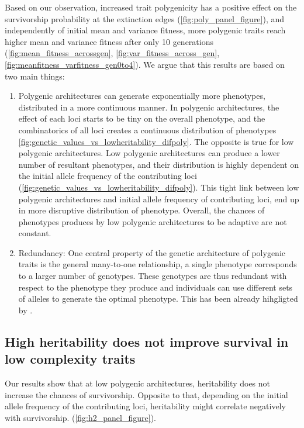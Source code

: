 \documentclass{article}
\begin{document}
Based on our observation, increased trait polygenicity has a positive effect on the survivorship probability at the extinction edges (\ref{fig:poly_panel_figure}), and independently of initial mean and variance fitness, more polygenic traits reach higher mean  and variance fitness after only 10 generations (\ref{fig:mean_fitness_acrossgen},  \ref{fig:var_fitness_across_gen}, \ref{fig:meanfitness_varfitness_gen0to4}). We argue that this results are based on two main things: 
\begin{enumerate}
    \item Polygenic architectures can generate exponentially more phenotypes, distributed in a more continuous manner. In polygenic architectures, the effect of each loci starts to be tiny on the overall phenotype, and the combinatorics of all loci creates a continuous distribution of phenotypes \ref{fig:genetic_values_vs_lowheritability_difpoly}. The opposite is true for low polygenic architectures. Low polygenic architectures can produce a lower number of resultant phenotypes, and their distribution is highly dependent on the initial allele frequency of the contributing loci (\ref{fig:genetic_values_vs_lowheritability_difpoly}). This tight link between low polygenic architectures and initial allele frequency of contributing loci, end up in more disruptive distribution of phenotype. Overall, the chances of phenotypes produces by low polygenic architectures to be adaptive are not constant. 

    \item Redundancy: One central property of the genetic architecture of polygenic traits is the general many-to-one relationship, a single phenotype corresponds to a larger number of genotypes. These genotypes are thus redundant with respect to the phenotype they produce and individuals can use different sets of alleles to generate the optimal phenotype. This has been already hihgligted by \citep{Orr2008-jl}. 
\end{enumerate}

\subsection{High heritability does not improve survival in low complexity traits}

Our results show that at low polygenic architectures, heritability does not increase the chances of survivorship. Opposite to that, depending on the initial allele frequency of the contributing loci, heritability might correlate negatively with survivorship. (\ref{fig:h2_panel_figure}).
\end{document}
